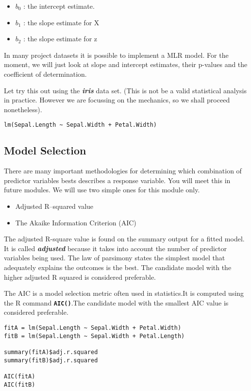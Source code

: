 \documentclass[a4paper,12pt]{article}
\begin{document}
\begin{itemize}
\item	$b_0$ : the intercept estimate.
\item	$b_1$  : the slope estimate for X
\item	$b_2$  : the slope estimate for z
\end{itemize}

In many project datasets it is possible to implement a MLR model. For the moment, we will just look at slope and intercept estimates, their p-values and the coefficient of determination.

Let try this out using the \textbf{\textit{iris}} data set. (This is not be a valid statistical analysis in practice. However we are focussing on the mechanics, so we shall proceed nonetheless).
\begin{framed}
\begin{verbatim}
lm(Sepal.Length ~ Sepal.Width + Petal.Width)
\end{verbatim}
\end{framed}



\subsection{Model Selection}
There are many important methodologies for determining which combination of predictor variables bests describes a response variable. You will meet this in future modules.
We will use two simple ones for this module only.
\begin{itemize}
\item Adjusted R–squared value
\item The Akaike Information Criterion (AIC)
\end{itemize}


The adjusted R-square value is found on the summary output for a fitted model. It is called \textbf{\emph{adjusted}} because it takes into account the number of predictor variables being used. The law of parsimony states the simplest model that adequately explains the outcomes is the best. The candidate model with the higher adjusted R squared is considered preferable.

The AIC is a model selection metric often used in statistics.It is computed using the R command
\texttt{\textbf{AIC()}}.The candidate model with the smallest AIC value is considered preferable.

\begin{framed}
\begin{verbatim}
fitA = lm(Sepal.Length ~ Sepal.Width + Petal.Width)
fitB = lm(Sepal.Length ~ Sepal.Width + Petal.Length)

summary(fitA)$adj.r.squared
summary(fitB)$adj.r.squared

AIC(fitA)
AIC(fitB)
\end{verbatim}
\end{framed}

\end{document}
